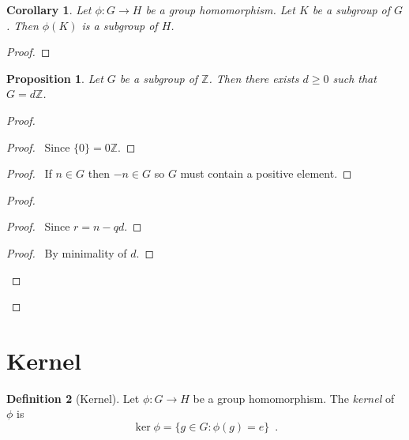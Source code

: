 \documentclass{book}
\let\qed\relax
\newtheorem{prop}{Proposition}[chapter]
\newtheorem{cor}{Corollary}[prop]
\theoremstyle{definition}
\newtheorem{df}[prop]{Definition}
\newcommand{\inv}[1]{\ensuremath{{#1}^{-1}}}
\begin{document}
\begin{cor}
Let $\phi : G \rightarrow H$ be a group homomorphism. Let $K$ be a subgroup of $G$. Then $\phi(K)$ is a subgroup of $H$.
\end{cor}

\begin{proof}
\pf
{}
\step{3}{$x\inv{y} = \phi(a\inv{b})$}
\step{4}{$x\inv{y} \in \phi(K)$}
\qed
\end{proof}

\begin{prop}
Let $G$ be a subgroup of $\mathbb{Z}$. Then there exists $d \geq 0$ such that $G = d \mathbb{Z}$.
\end{prop}

\begin{proof}
\pf
{}
\begin{proof}
\pf\ Since $\{0\} = 0 \mathbb{Z}$.
\end{proof}
\begin{proof}
\pf\ If $n \in G$ then $-n \in G$ so $G$ must contain a positive element.
\end{proof}
\begin{proof}
	\begin{proof}
		\pf\ Since $r = n - qd$.
	\end{proof}
	\begin{proof}
		\pf\ By minimality of $d$.
	\end{proof}
\end{proof}
\qed
\end{proof}

\section{Kernel}

\begin{df}[Kernel]
Let $\phi : G \rightarrow H$ be a group homomorphism. The \emph{kernel} of $\phi$ is
\[ \ker \phi = \{ g \in G : \phi(g) = e \} \enspace . \]
\end{df}
\end{document}
